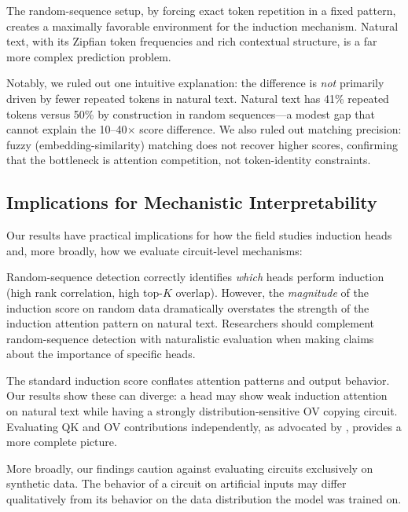 The random-sequence setup, by forcing exact token repetition in a fixed pattern, creates a maximally favorable environment for the induction mechanism.
Natural text, with its Zipfian token frequencies and rich contextual structure, is a far more complex prediction problem.

Notably, we ruled out one intuitive explanation: the difference is \emph{not} primarily driven by fewer repeated tokens in natural text.
Natural text has 41\% repeated tokens versus 50\% by construction in random sequences---a modest gap that cannot explain the 10--40$\times$ score difference.
We also ruled out matching precision: fuzzy (embedding-similarity) matching does not recover higher scores, confirming that the bottleneck is attention competition, not token-identity constraints.

\subsection{Implications for Mechanistic Interpretability}
\label{sec:discussion_implications}

Our results have practical implications for how the field studies induction heads and, more broadly, how we evaluate circuit-level mechanisms:

Random-sequence detection correctly identifies \emph{which} heads perform induction (high rank correlation, high top-$K$ overlap).
However, the \emph{magnitude} of the induction score on random data dramatically overstates the strength of the induction attention pattern on natural text.
Researchers should complement random-sequence detection with naturalistic evaluation when making claims about the importance of specific heads.

The standard induction score conflates attention patterns and output behavior.
Our results show these can diverge: a head may show weak induction attention on natural text while having a strongly distribution-sensitive OV copying circuit.
Evaluating QK and OV contributions independently, as advocated by \citet{elhage2021mathematical}, provides a more complete picture.

More broadly, our findings caution against evaluating circuits exclusively on synthetic data.
The behavior of a circuit on artificial inputs may differ qualitatively from its behavior on the data distribution the model was trained on.

